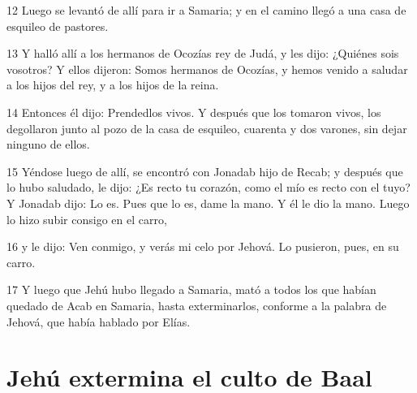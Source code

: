 \par 12 Luego se levantó de allí para ir a Samaria; y en el camino llegó a una casa de esquileo de pastores.
\par 13 Y halló allí a los hermanos de Ocozías rey de Judá, y les dijo: ¿Quiénes sois vosotros? Y ellos dijeron: Somos hermanos de Ocozías, y hemos venido a saludar a los hijos del rey, y a los hijos de la reina.
\par 14 Entonces él dijo: Prendedlos vivos. Y después que los tomaron vivos, los degollaron junto al pozo de la casa de esquileo, cuarenta y dos varones, sin dejar ninguno de ellos.
\par 15 Yéndose luego de allí, se encontró con Jonadab hijo de Recab; y después que lo hubo saludado, le dijo: ¿Es recto tu corazón, como el mío es recto con el tuyo? Y Jonadab dijo: Lo es. Pues que lo es, dame la mano. Y él le dio la mano. Luego lo hizo subir consigo en el carro,
\par 16 y le dijo: Ven conmigo, y verás mi celo por Jehová. Lo pusieron, pues, en su carro.
\par 17 Y luego que Jehú hubo llegado a Samaria, mató a todos los que habían quedado de Acab en Samaria, hasta exterminarlos, conforme a la palabra de Jehová, que había hablado por Elías.

\section*{Jehú extermina el culto de Baal}

